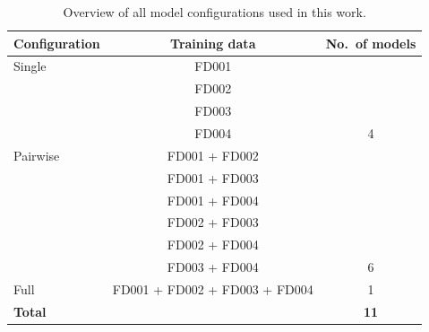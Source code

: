 \begin{table}[h]
\centering
\caption{Overview of all model configurations used in this work.}
\label{tab:models}
\begin{tabular}{lcc}
\toprule
\textbf{Configuration} & \textbf{Training data} & \textbf{No.\ of models} \\
\midrule
Single   & FD001                         & \\
         & FD002                         & \\
         & FD003                         & \\
         & FD004                         & 4 \\
\midrule
Pairwise & FD001 + FD002                 & \\
         & FD001 + FD003                 & \\
         & FD001 + FD004                 & \\
         & FD002 + FD003                 & \\
         & FD002 + FD004                 & \\
         & FD003 + FD004                 & 6 \\
\midrule
Full     & FD001 + FD002 + FD003 + FD004 & 1 \\
\midrule
\textbf{Total} & & \textbf{11} \\
\bottomrule
\end{tabular}
\end{table}



